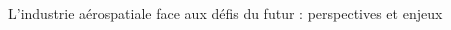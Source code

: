 \documentclass[final]{beamer}
\begin{document}
\begin{frame}
\begin{center}
\begin{minipage}{\textwidth}
\begin{block}{\rule[-0.6ex]{0pt}{50pt}\centering\LARGE L'industrie a\'erospatiale face aux d\'efis du futur : perspectives et enjeux}
\begin{columns}
\begin{column}{0.325\textwidth}
\begin{center}
\begin{figure}[!h]
     \\[50pt]
\end{figure}
     \end{center}
\end{column}
\begin{column}{0.3\textwidth}  %

\end{column}
\end{columns}
\end{block}
\end{minipage}
\end{center}
\end{frame}
\end{document}
